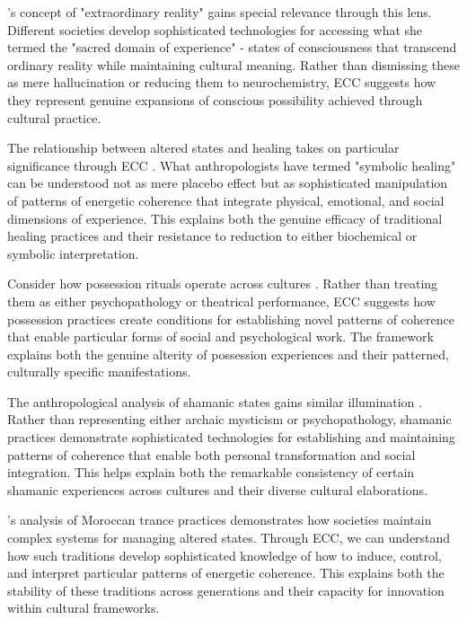 \cite{myerhoff1974peyote}'s concept of "extraordinary reality" gains special relevance through this lens. Different societies develop sophisticated technologies for accessing what she termed the "sacred domain of experience" - states of consciousness that transcend ordinary reality while maintaining cultural meaning. Rather than dismissing these as mere hallucination or reducing them to neurochemistry, ECC suggests how they represent genuine expansions of conscious possibility achieved through cultural practice.

The relationship between altered states and healing takes on particular significance through ECC \cite{csordas2002body}. What anthropologists have termed "symbolic healing" can be understood not as mere placebo effect but as sophisticated manipulation of patterns of energetic coherence that integrate physical, emotional, and social dimensions of experience. This explains both the genuine efficacy of traditional healing practices and their resistance to reduction to either biochemical or symbolic interpretation.

Consider how possession rituals operate across cultures \cite{boddy1994spirit}. Rather than treating them as either psychopathology or theatrical performance, ECC suggests how possession practices create conditions for establishing novel patterns of coherence that enable particular forms of social and psychological work. The framework explains both the genuine alterity of possession experiences and their patterned, culturally specific manifestations.

The anthropological analysis of shamanic states gains similar illumination \cite{noll1983shamanism}. Rather than representing either archaic mysticism or psychopathology, shamanic practices demonstrate sophisticated technologies for establishing and maintaining patterns of coherence that enable both personal transformation and social integration. This helps explain both the remarkable consistency of certain shamanic experiences across cultures and their diverse cultural elaborations.

\cite{crapanzano1973hamadsha}'s analysis of Moroccan trance practices demonstrates how societies maintain complex systems for managing altered states. Through ECC, we can understand how such traditions develop sophisticated knowledge of how to induce, control, and interpret particular patterns of energetic coherence. This explains both the stability of these traditions across generations and their capacity for innovation within cultural frameworks.

